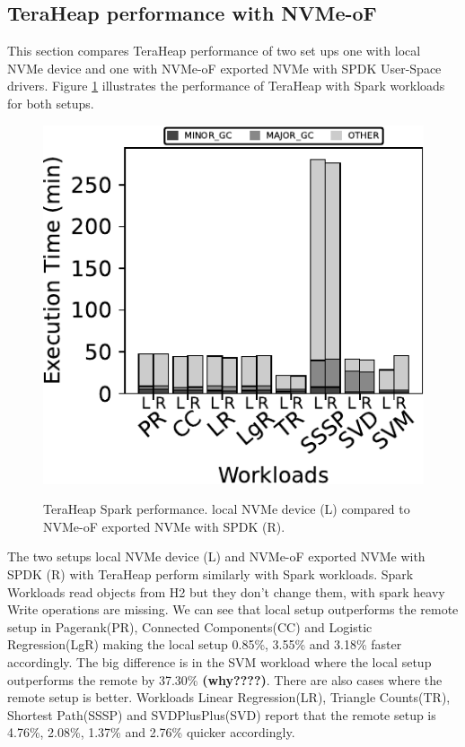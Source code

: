 \subsection{TeraHeap performance with NVMe-oF}
\par This section compares TeraHeap performance of two set ups one with local NVMe device and one with NVMe-oF exported NVMe with SPDK User-Space drivers. Figure \ref{fig:bench_spark} illustrates the performance of TeraHeap with Spark workloads for both setups.
\begin{figure}[H]
  \includegraphics[width=\linewidth]{figures/bench_spark.pdf}\\
\caption{TeraHeap Spark performance. local NVMe device (L) compared to NVMe-oF exported NVMe with SPDK (R).}
\label{fig:bench_spark}
\end{figure}
The two setups local NVMe device (L) and NVMe-oF exported NVMe with SPDK (R) with TeraHeap perform similarly with Spark workloads. Spark Workloads read objects from H2 but they don't change them, with spark heavy Write operations are missing. We can see that local setup outperforms the remote setup in Pagerank(PR), Connected Components(CC) and Logistic Regression(LgR) making the local setup 0.85\%, 3.55\% and 3.18\% faster accordingly. The big difference is in the SVM workload where the local setup outperforms the remote by 37.30\% \textbf{(why????)}. There are also cases where the remote setup is better. Workloads Linear Regression(LR), Triangle Counts(TR), Shortest Path(SSSP) and SVDPlusPlus(SVD) report that the remote setup is 4.76\%, 2.08\%, 1.37\% and 2.76\% quicker accordingly.
